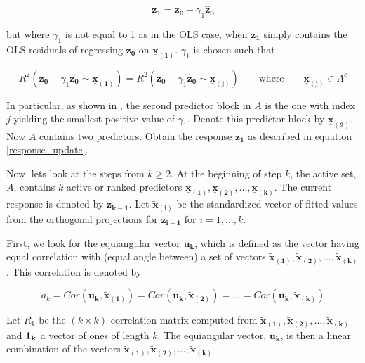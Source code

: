 \begin{equation}\label{response_update}
\mathbf{z_1} = \mathbf{z_0} - \gamma_1 \mathbf{\hat{z}_0}
\end{equation}

\noindent but where $\gamma_1$ is not equal to 1 as in the OLS case, when $\mathbf{z_1}$ simply contains the OLS residuals of regressing $\mathbf{z_0}$ on $\mathbf{\underline{x}_{(1)}}$. $\gamma_1$ is chosen such that 

\begin{equation}\label{gamma_selection}
R^2(\mathbf{z_0} - \gamma_1  \mathbf{\hat{z}_0} \sim \mathbf{\underline{x}_{(1)}}) = R^2(\mathbf{z_0} - \gamma_1  \mathbf{\hat{z}_0} \sim \mathbf{\underline{x}_{(j)}}) \quad \quad \text{where} \quad \quad \mathbf{\underline{x}_{(j)}} \in A^c
\end{equation}

In particular, as shown in \cite{gelper2008}, the second predictor block in $A$ is the one with index $j$ yielding the smallest positive value of $\gamma_1$. Denote this predictor block by $\mathbf{\underline{x}_{(2)}}$. Now $A$ contains two predictors. Obtain the response $\mathbf{z_1}$ as described in equation \eqref{response_update}.

Now, lets look at the steps from $k \geq 2$. At the beginning of step $k$, the active set, $A$, contains $k$ active or ranked predictors $\mathbf{\underline{x}_{(1)}}, \mathbf{\underline{x}_{(2)}}, \ldots, \mathbf{\underline{x}_{(k)}}$. The current response is denoted by $\mathbf{z_{k - 1}}$. Let $\mathbf{\tilde{x}_{(i)}}$ be the standardized vector of fitted values from the orthogonal projections for $\mathbf{z_{i - 1}}$ for $i = 1,  \ldots , k$.

First, we look for the equiangular vector $\mathbf{u_k}$, which is defined as the vector having equal correlation with (equal angle between) a set of vectors $\mathbf{\tilde{x}_{(1)}, \tilde{x}_{(2)}, \ldots, \tilde{x}_{(k)}}$. This correlation is denoted by 

\begin{equation}\label{equiangular_corr}
a_k = Cor(\mathbf{u_k} , \mathbf{\tilde{x}_{(1)}}) = Cor(\mathbf{u_k}, \mathbf{\tilde{x}_{(2)}})= \ldots = Cor(\mathbf{u_k}, \mathbf{\tilde{x}_{(k)}})
\end{equation}

Let $R_k$ be the $(k \times k)$ correlation matrix computed from $\mathbf{\tilde{x}_{(1)}, \tilde{x}_{(2)}, \ldots, \tilde{x}_{(k)}}$ and $\bf{1_k}$ a vector of ones of length $k$. The equiangular vector, $\mathbf{u_k}$, is then a linear combination of the vectors $\mathbf{\tilde{x}_{(1)}, \tilde{x}_{(2)}, \ldots, \tilde{x}_{(k)}}$

